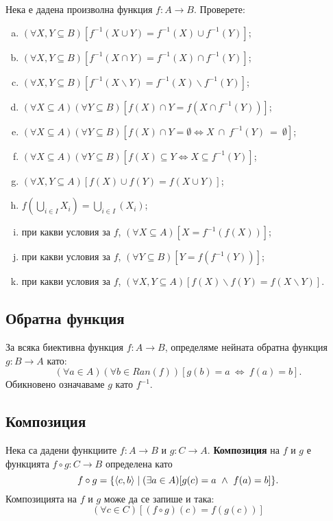 \begin{problem}
  Нека е дадена произволна функция $f:A \to B$.
  Проверете:
  \begin{enumerate}[a)]
  \item
    $(\forall X,Y \subseteq B)[f^{-1}(X\cup Y) = f^{-1}(X)\cup f^{-1}(Y)]$;
  \item
    $(\forall X,Y \subseteq B)[f^{-1}(X\cap Y) = f^{-1}(X)\cap f^{-1}(Y)]$;
  \item
    $(\forall X,Y \subseteq B)[f^{-1}(X\backslash Y) = f^{-1}(X)\backslash f^{-1}(Y)]$;
  \item
    $(\forall X\subseteq A)(\forall Y\subseteq B)[f(X)\cap Y = f(X\cap f^{-1}(Y))]$;
  \item
    $(\forall X \subseteq A)(\forall Y \subseteq B)[f(X)\cap Y = \emptyset \iff  X~\cap~f^{-1}(Y)~=~\emptyset]$;
  \item
    $(\forall X \subseteq A)(\forall Y \subseteq B)[f(X)\subseteq Y \iff X\subseteq f^{-1}(Y)]$;
  \item
    $(\forall X,Y \subseteq A)[f(X)\cup f(Y) = f(X\cup Y)]$;
  \item
    $f(\bigcup_{i\in I}X_i) = \bigcup_{i\in I}(X_i)$;
  \item
    при какви условия за $f$,
    $(\forall X\subseteq A)[X =  f^{-1}(f(X))]$;
  \item
    при какви условия за $f$,
    $(\forall Y \subseteq B)[Y = f(f^{-1}(Y))]$;
  \item
    при какви условия за $f$,
    $(\forall X,Y \subseteq A)[f(X)\backslash f(Y) = f(X\backslash Y)]$.
  \end{enumerate}
\end{problem}

\subsection*{Обратна функция}

За всяка биективна функция $f:A\to B$, определяме нейната обратна функция $g:B \to  A$ като:
\[(\forall a \in A)(\forall b \in Ran(f))[g(b) = a\ \iff\ f(a) = b].\]
Обикновено означаваме $g$ като $f^{-1}$.

\subsection*{Композиция}

Нека са дадени функциите $f:A\to B$ и $g:C\to A$.
{\bf Композиция} на $f$ и $g$ е функцията $f\circ g: C \to B$ определена като
\[f\circ g = \{\langle{c,b}\rangle\mid (\exists a\in A)[g(c) = a\ \wedge\ f(a) = b]\}.\]
Композицията на $f$ и $g$ може да се запише и така:
\[(\forall c\in C)[(f\circ g)(c) = f(g(c))]\]

